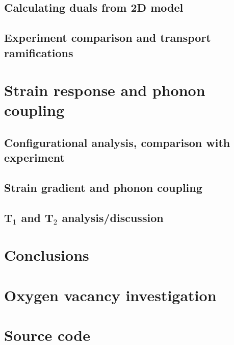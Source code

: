    \section{Calculating duals from 2D model}
    \section{Experiment comparison and transport ramifications}
    \chapter{Strain response and phonon coupling}
    \section{Configurational analysis, comparison with experiment}
    \section{Strain gradient and phonon coupling}
    \section{\texorpdfstring{T$_1$ and T$_2$}{T₁ and T₂} analysis/discussion}
    \chapter{Conclusions}

    
    \begin{singlespace} %
    \newcommand{\maybebackrefprint}{ \backrefprint}
    \renewcommand*{\bibpreamble}{\thumb{Bibliography}}%
    
    \end{singlespace}

  
    \chapter{Oxygen vacancy investigation}
    \chapter{Source code}

  \backmatter



